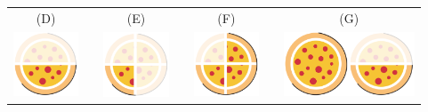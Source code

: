\documentclass[10 pt,usenames,dvipsnames, oneside]{article}
\begin{document}
\begin{center}
\begin{tabular}{ccccccc}
(D)&\quad\quad\quad & (E) &\quad\quad\quad&  (F) &\quad\quad\quad&  (G) \\
 \includegraphics[width=55pt, keepaspectratio]{ativ2_fig_b_meia_pizza.png} & & \includegraphics[width=55pt, keepaspectratio]{ativ2_fig_b_quarto_pizza.png} & &\includegraphics[width=55pt, keepaspectratio]{ativ2_fig_b_tres_quartos_pizza.png} & &\includegraphics[width=55pt, keepaspectratio]{pizza.png}\includegraphics[width=55pt, keepaspectratio]{ativ2_fig_b_meia_pizza.png}
\end{tabular}
\end{center}
\end{document}
